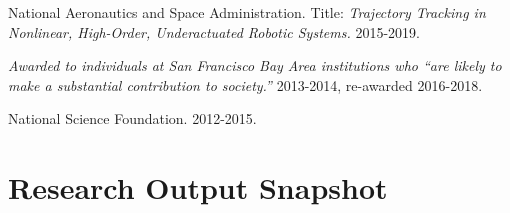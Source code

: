 \documentclass[letterpaper]{deedy-resume} %
\newcommand\Tstrut{\rule{0pt}{2.6ex}}         %
\begin{document}
{\begin{etaremune}[itemsep=0.05cm]
\item {{} National Aeronautics and Space Administration. Title: {\it Trajectory Tracking in Nonlinear, High-Order, Underactuated Robotic Systems.} 2015-2019.}
  

\item {{} {\it Awarded to individuals at San Francisco Bay Area institutions who ``are likely to make a substantial contribution to society.''} 2013-2014, re-awarded 2016-2018.}

\item {{} National Science Foundation. 2012-2015.}

\end{etaremune}


\vspace{0.2cm}
\section{Research Output Snapshot}
 

}
\end{document}
